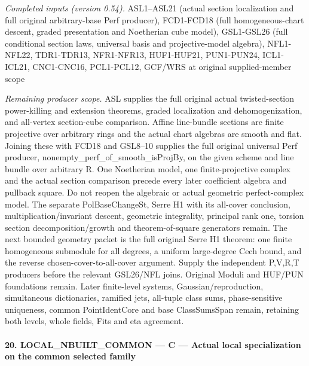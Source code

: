 \documentclass[11pt,a4paper]{article}
\numberwithin{equation}{section}
\theoremstyle{remark}\newtheorem{remark}[theorem]{Remark}
\begin{document}
\emph{Completed inputs (version 0.54).} ASL1–ASL21 (actual section localization and full original arbitrary-base Perf producer), FCD1-FCD18 (full homogeneous-chart descent, graded presentation and Noetherian cube model), GSL1-GSL26 (full conditional section laws, universal basis and projective-model algebra), NFL1-NFL22, TDR1-TDR13, NFR1-NFR13, HUF1-HUF21, PUN1-PUN24, ICL1-ICL21, CNC1-CNC16, PCL1-PCL12, GCF/WRS at original supplied-member scope

\emph{Remaining producer scope.} ASL supplies the full original actual twisted-section power-killing and extension theorems, graded localization and dehomogenization, and all-vertex section-cube comparison. Affine line-bundle sections are finite projective over arbitrary rings and the actual chart algebras are smooth and flat. Joining these with FCD18 and GSL8–10 supplies the full original universal Perf producer, nonempty\_\allowbreak perf\_\allowbreak of\_\allowbreak smooth\_\allowbreak isProjBy, on the given scheme and line bundle over arbitrary R. One Noetherian model, one finite-projective complex and the actual section comparison precede every later coefficient algebra and pullback square. Do not reopen the algebraic or actual geometric perfect-complex model. The separate PolBaseChangeSt, Serre H1 with its all-cover conclusion, multiplication/invariant descent, geometric integrality, principal rank one, torsion section decomposition/growth and theorem-of-square generators remain. The next bounded geometry packet is the full original Serre H1 theorem: one finite homogeneous submodule for all degrees, a uniform large-degree Cech bound, and the reverse chosen-cover-to-all-cover argument. Supply the independent P,V,R,T producers before the relevant GSL26/NFL joins. Original Moduli and HUF/PUN foundations remain. Later finite-level systems, Gaussian/reproduction, simultaneous dictionaries, ramified jets, all-tuple class sums, phase-sensitive uniqueness, common PointIdentCore and base ClassSumsSpan remain, retaining both levels, whole fields, Fits and eta agreement.



\paragraph{20. LOCAL\_\allowbreak NBUILT\_\allowbreak COMMON — C — Actual local specialization on the common selected family}
\end{document}
